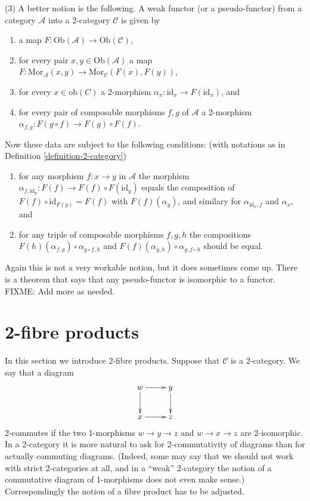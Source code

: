 \begin{remarks}
\medskip\noindent
(3) A better notion is the following. A weak functor (or a pseudo-functor)
from a category $\mathcal{A}$ into a 2-category $\mathcal{C}$ is given by 
\begin{enumerate}
\item a map $F : \text{Ob}(\mathcal{A}) \to \text{Ob}(\mathcal{C})$,
\item for every pair $x,y\in \text{Ob}(\mathcal{A})$ a map
$F : \text{Mor}_{\mathcal{A}}(x,y) \to  \text{Mor}_{\mathcal{C}}(F(x),F(y))$,
\item for every $x\in \text{ob}(C)$ a $2$-morphism
$\alpha_x : \text{id}_x \to F(\text{id}_{x})$, and
\item for every pair of composable morphisms $f,g$ of $\mathcal{A}$ a 
$2$-morphism $\alpha_{f,g} : F(g \circ f) \to F(g) \circ F(f)$.
\end{enumerate}
Now these data are subject to the following conditions:
(with notations as in Definition \ref{definition-2-category})
\begin{enumerate}
\item for any morphism $f : x \to y$ in $\mathcal{A}$ the morphism
$\alpha_{f,\text{id}_y} : F(f) \to F(f) \circ F(\text{id}_y)$
equals the composition of $F(f) \circ \text{id}_{F(y)} = F(f)$ with
$F(f)(\alpha_y)$, and similary for $\alpha_{\text{id}_x,f}$ and
$\alpha_x$, and
\item for any triple of composable morphisms $f,g,h$ the
compositions $F(h)(\alpha_{f,g}) \circ \alpha_{g\circ f, h}$ and
$F(f)(\alpha_{g,h}) \circ \alpha_{g,f\circ h}$ should be equal.
\end{enumerate}
Again this is not a very workable notion, but it does sometimes come up.
There is a theorem that says that any pseudo-functor is isomorphic to
a functor. FIXME: Add more as needed.
\end{remarks}

\section{2-fibre products}
\label{section-2-fibre-products}

\noindent
In this section we introduce $2$-fibre products. Suppose that $\mathcal{C}$
is a 2-category. We say that a diagram
$$
\xymatrix{
w \ar[r] \ar[d] & y \ar[d] \\
x \ar[r] & z }
$$
2-commutes if the two 1-morphisms $w \to y \to z$ and $w \to x \to z$ are
2-isomorphic. In a 2-category it is more natural to ask for 2-commutativity 
of diagrams than for actually commuting diagrams. (Indeed, some may say that
we should not work with strict 2-categories at all, and in a ``weak''
2-category the notion of a commutative diagram of 1-morphisms does not even
make sense.) Correspondingly the notion of a fibre product has to be adjusted.

